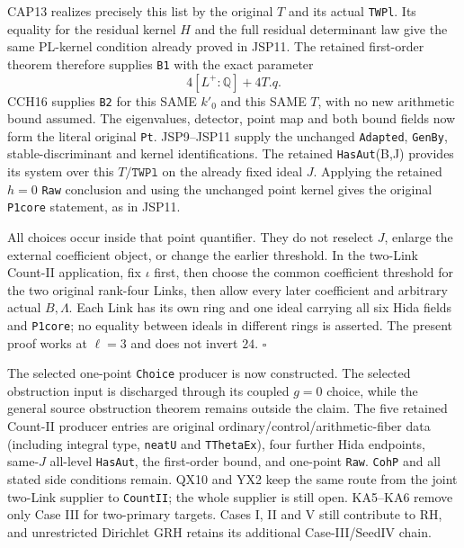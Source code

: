 CAP13 realizes precisely this list by the original $T$
and its actual \texttt{TWPl}.  Its equality for the residual
kernel $H$ and the full residual determinant law give the
same PL-kernel condition already proved in JSP11.  The
retained first-order theorem therefore supplies
\texttt{B1} with the exact parameter
\[
                       4[L^+:\mathbb Q]+4T.q.
\]
CCH16 supplies \texttt{B2} for this SAME $k'_0$ and this
SAME $T$, with no new arithmetic bound assumed.
The eigenvalues, detector, point map and both bound fields
now form the literal original \texttt{Pt}.
JSP9--JSP11 supply the unchanged \texttt{Adapted},
\texttt{GenBy}, stable-discriminant and kernel identifications.
The retained \texttt{HasAut}(B,J) provides its system over
this $T/\texttt{TWPl}$ on the already fixed ideal $J$.
Applying the retained $h=0$ \texttt{Raw} conclusion and
using the unchanged point kernel gives the original
\texttt{P1core} statement, as in JSP11.

All choices occur inside that point quantifier.  They do
not reselect $J$, enlarge the external coefficient object,
or change the earlier threshold.  In the two-Link Count-II
application, fix $\iota$ first, then choose the common
coefficient threshold for the two original rank-four Links,
then allow every later coefficient and arbitrary actual
$B,\Lambda$.  Each Link has its own ring and one ideal
carrying all six Hida fields and \texttt{P1core}; no equality
between ideals in different rings is asserted.
The present proof works at $\ell=3$ and does not invert $24$.
\hfill$\square$

The selected one-point \texttt{Choice} producer is now
constructed.  The selected obstruction input is discharged
through its coupled $g=0$ choice, while the general source
obstruction theorem remains outside the claim.
The five retained Count-II producer entries are original
ordinary/control/arithmetic-fiber data (including integral
type, \texttt{neatU} and \texttt{TThetaEx}), four further
Hida endpoints, same-$J$ all-level \texttt{HasAut}, the
first-order bound, and one-point \texttt{Raw}.
\texttt{CohP} and all stated side conditions remain.
QX10 and YX2 keep the same route from the joint two-Link
supplier to \texttt{CountII}; the whole supplier is still open.
KA5--KA6 remove only Case III for two-primary targets.
Cases I, II and V still contribute to RH, and unrestricted
Dirichlet GRH retains its additional Case-III/SeedIV chain.
